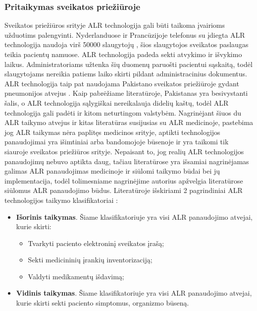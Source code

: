\subsubsection{Pritaikymas sveikatos priežiūroje}
Sveikatos priežiūros srityje ALR technologija gali būti taikoma įvairioms užduotims palengvinti. Nyderlanduose ir Prancūzijoje telefonus su įdiegta ALR technologija naudoja virš 50000 slaugytojų \cite{ShyamThangaraju2013}, šios slaugytojos sveikatos paslaugas teikia pacientų namuose. ALR technologija padeda sekti atvykimo ir išvykimo laikus. Administratoriams užtenka šių duomenų paruošti pacientui sąskaitą, todėl slaugytojams nereikia patiems laiko skirti pildant administracinius dokumentus. ALR technologija taip pat naudojama Pakistano sveikatos priežiūroje gydant pneumonijos atvejus \cite{Marcus}. Kaip pabrėžiame literatūroje, Pakistanas yra besivystanti šalis, o ALR technologija sąlygiškai nereikalauja didelių kaštų, todėl ALR technologija gali padėti ir kitom neturtingom valstybėm. Nagrinėjant šiuos du ALR taikymo atvejus ir kitas literatūras susijusias su ALR medicinoje, pastebima jog ALR taikymas nėra paplitęs medicinos srityje, aptikti technologijos panaudojimai yra išimtiniai arba bandomojoje būsenoje ir yra taikomi tik siauroje sveikatos priežiūros srityje. Nepaisant to, jog realių ALR technologijos panaudojimų nebuvo aptikta daug, tačiau literatūrose yra išsamiai nagrinėjamas galimas ALR panaudojimas medicinoje ir siūlomi taikymo būdai bei jų implementacija, todėl tolimesniame nagrinėjime autorius apžvelgia literatūrose siūlomus ALR panaudojimo būdus. Literatūroje išskiriami 2 pagrindiniai ALR technologijos taikymo klasifikatoriai \cite{Gautam}:
\begin{itemize}
    \item \textbf{Išorinis taikymas}. Šiame klasifikatoriuje yra visi ALR panaudojimo atvejai, kurie skirti:
        \begin{itemize}
            \item Tvarkyti paciento elektroninį sveikatos įrašą;  
            \item Sekti medicininių įrankių inventorizaciją;
            \item Valdyti medikamentų išdavimą;
        \end{itemize}
    \item \textbf{Vidinis taikymas}. Šiame klasifikatoriuje yra visi ALR panaudojimo atvejai, kurie skirti sekti paciento simptomus, organizmo būseną.
\end{itemize}
 
